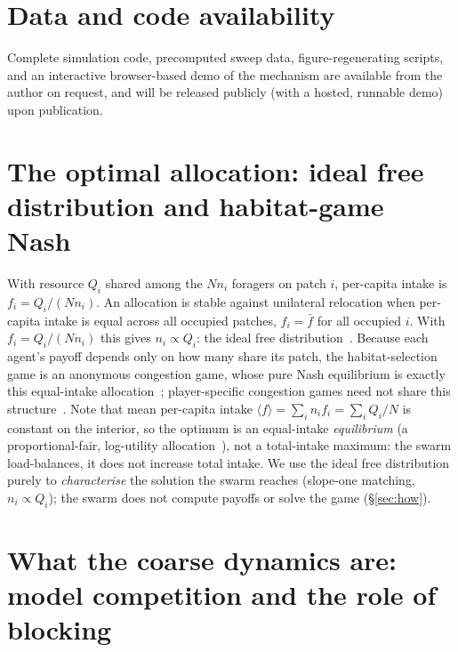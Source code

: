 \documentclass{article}
\newif\ifanon
\begin{document}
\section*{Data and code availability}
\ifanon
Complete simulation code, precomputed sweep data, figure-regenerating scripts, and an interactive
browser-based demo of the mechanism are available in a code repository. To preserve anonymity, the repository
is kept private and its URL---together with the publicly hosted, runnable demo---is withheld for review; both
will be released publicly in the camera-ready version.
\else
Complete simulation code, precomputed sweep data, figure-regenerating scripts, and an interactive
browser-based demo of the mechanism are available from the author on request, and will be released publicly
(with a hosted, runnable demo) upon publication.
\fi

\appendix
\section{The optimal allocation: ideal free distribution and habitat-game Nash}
\label{app:optimum}
With resource $Q_i$ shared among the $N n_i$ foragers on patch $i$, per-capita intake is $f_i=Q_i/(N n_i)$.
An allocation is stable against unilateral relocation when per-capita intake is equal across all occupied
patches, $f_i=\bar f$ for all occupied $i$. With $f_i=Q_i/(N n_i)$ this gives $n_i\propto Q_i$: the ideal free
distribution~\citep{fretwell1969ideal}. Because each agent's payoff depends only on how many share its patch,
the habitat-selection game is an anonymous congestion game, whose pure Nash equilibrium is exactly this
equal-intake allocation~\citep{rosenthal1973congestion,wardrop1952road}; player-specific congestion games need
not share this structure~\citep{milchtaich1996congestion}. Note that mean per-capita intake
$\langle f\rangle=\sum_i n_i f_i=\sum_i Q_i/N$ is constant on the interior, so the optimum is an equal-intake
\emph{equilibrium} (a proportional-fair, log-utility allocation~\citep{kelly1998rate}), not a total-intake
maximum: the swarm load-balances, it does not increase total intake. We use the ideal free distribution purely
to \emph{characterise} the solution the swarm reaches (slope-one matching, $n_i\propto Q_i$); the swarm does not
compute payoffs or solve the game (\S\ref{sec:how}).

\section{What the coarse dynamics are: model competition and the role of blocking}
\label{app:dynamics}
\end{document}
